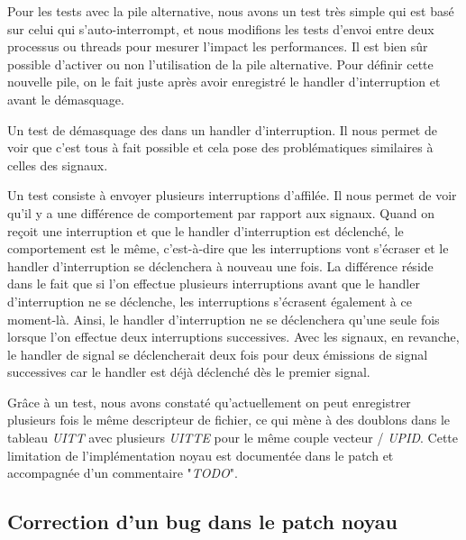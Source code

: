 Pour les tests avec la pile alternative, nous avons un test très simple qui est basé sur celui qui s'auto-interrompt, et nous modifions les tests d'envoi entre deux processus ou threads pour mesurer l'impact les performances.
Il est bien sûr possible d'activer ou non l'utilisation de la pile alternative.
Pour définir cette nouvelle pile, on le fait juste après avoir enregistré le handler d'interruption et avant le démasquage.

Un test de démasquage des \uintr{} dans un handler d'interruption.
Il nous permet de voir que c'est tous à fait possible et cela pose des problématiques similaires à celles des signaux.

Un test consiste à envoyer plusieurs interruptions d'affilée.
Il nous permet de voir qu'il y a une différence de comportement par rapport aux signaux.
Quand on reçoit une interruption et que le handler d'interruption est déclenché, le comportement est le même,
c'est-à-dire que les interruptions vont s'écraser et le handler d'interruption se déclenchera à nouveau une fois.
La différence réside dans le fait que si l'on effectue plusieurs interruptions avant que le handler d'interruption ne se déclenche,
les interruptions s'écrasent également à ce moment-là.
Ainsi, le handler d'interruption ne se déclenchera qu'une seule fois lorsque l'on effectue deux interruptions successives.
Avec les signaux, en revanche, le handler de signal se déclencherait deux fois pour deux émissions de signal successives car le handler est déjà déclenché dès le premier signal.

Grâce à un test, nous avons constaté qu'actuellement on peut enregistrer plusieurs fois le même descripteur de fichier,
ce qui mène à des doublons dans le tableau \emph{UITT} avec plusieurs \emph{UITTE} pour le même couple vecteur / \emph{UPID}.
Cette limitation de l'implémentation noyau est documentée dans le patch et accompagnée d'un commentaire "\emph{TODO}".

\subsection{Correction d'un bug dans le patch noyau}

